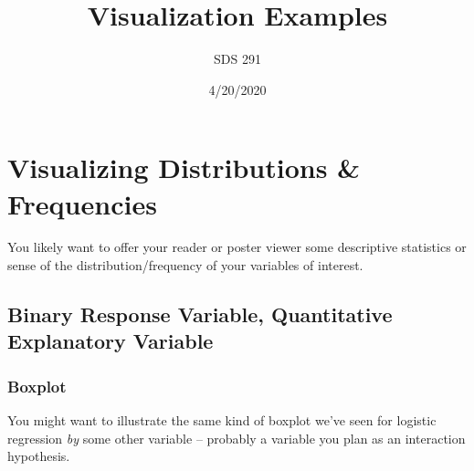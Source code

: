 \documentclass[]{article}
\title{Visualization Examples}
\author{SDS 291}
\date{4/20/2020}
\newenvironment{Shaded}{\begin{snugshade}}{\end{snugshade}}
\newcommand{\DataTypeTok}[1]{\textcolor[rgb]{0.13,0.29,0.53}{#1}}
\newcommand{\DecValTok}[1]{\textcolor[rgb]{0.00,0.00,0.81}{#1}}
\newcommand{\KeywordTok}[1]{\textcolor[rgb]{0.13,0.29,0.53}{\textbf{#1}}}
\newcommand{\NormalTok}[1]{#1}
\newcommand{\OperatorTok}[1]{\textcolor[rgb]{0.81,0.36,0.00}{\textbf{#1}}}
\newcommand{\OtherTok}[1]{\textcolor[rgb]{0.56,0.35,0.01}{#1}}
\newcommand{\StringTok}[1]{\textcolor[rgb]{0.31,0.60,0.02}{#1}}
\begin{document}
\maketitle

{
\setcounter{tocdepth}{2}
\tableofcontents
}
\hypertarget{visualizing-distributions-frequencies}{%
\section{Visualizing Distributions \&
Frequencies}\label{visualizing-distributions-frequencies}}

You likely want to offer your reader or poster viewer some descriptive
statistics or sense of the distribution/frequency of your variables of
interest.

\begin{Shaded}
\end{Shaded}

\hypertarget{binary-response-variable-quantitative-explanatory-variable}{%
\subsection{Binary Response Variable, Quantitative Explanatory
Variable}\label{binary-response-variable-quantitative-explanatory-variable}}

\hypertarget{boxplot}{%
\subsubsection{Boxplot}\label{boxplot}}

You might want to illustrate the same kind of boxplot we've seen for
logistic regression \emph{by} some other variable -- probably a variable
you plan as an interaction hypothesis.
\end{document}
